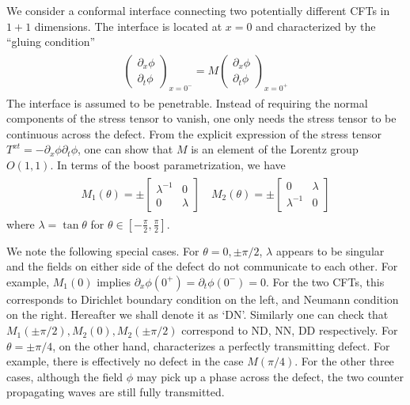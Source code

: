 We consider a conformal interface connecting two potentially different CFTs in $1+1$ dimensions. The interface is located at $x=0$ and characterized by the ``gluing condition''
\begin{eqnarray}\begin{aligned}
\label{eq:def_M}
\begin{pmatrix}
\partial_x\phi\\
\partial_t\phi
\end{pmatrix}_{x=0^-}
=M\begin{pmatrix}
\partial_x\phi\\
\partial_t\phi
\end{pmatrix}_{x=0^+}
\end{aligned}\end{eqnarray}
The interface is assumed to be penetrable. Instead of requiring the normal components of the stress tensor to vanish\cite{cardy_conformal_1984}, one only needs the stress tensor to be continuous across the defect. From the explicit expression of the stress tensor $T^{xt}=-\partial_x\phi\partial_t\phi$, one can show that\cite{bachas_permeable_2002} $M$ is an element of the Lorentz group $O(1,1)$. In terms of the boost parametrization, we have
\begin{eqnarray}\begin{aligned}
M_1(\theta)=\pm
\begin{bmatrix}
\lambda^{-1} & 0 \\
0 & \lambda
\end{bmatrix}\quad
M_2(\theta)=\pm
\begin{bmatrix}
0 & \lambda  \\
\lambda^{-1} & 0 
\end{bmatrix}
\end{aligned}\end{eqnarray}
where $\lambda=\tan\theta$ for $\theta\in\left[-\frac{\pi}{2},\frac{\pi}{2}\right]$. 

We note the following special cases. For $\theta=0,\pm\pi/2$, $\lambda$ appears to be singular and the fields on either side of the defect do not communicate to each other. For example, $M_1(0)$ implies $\partial_x\phi(0^+)=\partial_t\phi(0^-)=0$. For the two CFTs, this corresponds to Dirichlet boundary condition on the left, and Neumann condition on the right. Hereafter we shall denote it as `DN'. Similarly one can check that $M_1(\pm\pi/2),M_2(0),M_2(\pm\pi/2)$ correspond to ND, NN, DD respectively. For $\theta=\pm\pi/4$, on the other hand, characterizes a perfectly transmitting defect. For example, there is effectively no defect in the case $M(\pi/4)$. For the other three cases, although the field $\phi$ may pick up a phase across the defect, the two counter propagating waves are still fully transmitted.

